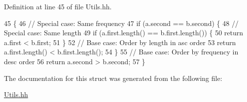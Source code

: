 Definition at line 45 of file Utils.\+hh.


\begin{DoxyCode}
45                                                                                 \{
46             \textcolor{comment}{// Special case: Same frequency}
47             \textcolor{keywordflow}{if} (a.second == b.second) \{
48                 \textcolor{comment}{// Special case: Same length}
49                 \textcolor{keywordflow}{if} (a.first.length() == b.first.length()) \{
50                     \textcolor{keywordflow}{return} a.first < b.first;
51                 \}
52                 \textcolor{comment}{// Base case: Order by length in asc order}
53                 \textcolor{keywordflow}{return} a.first.length() < b.first.length();
54             \}
55             \textcolor{comment}{// Base case: Order by frequency in desc order}
56             \textcolor{keywordflow}{return} a.second > b.second;
57         \}
\end{DoxyCode}


The documentation for this struct was generated from the following file\+:\begin{DoxyCompactItemize}
\item 
\hyperlink{_utils_8hh}{Utils.\+hh}\end{DoxyCompactItemize}
